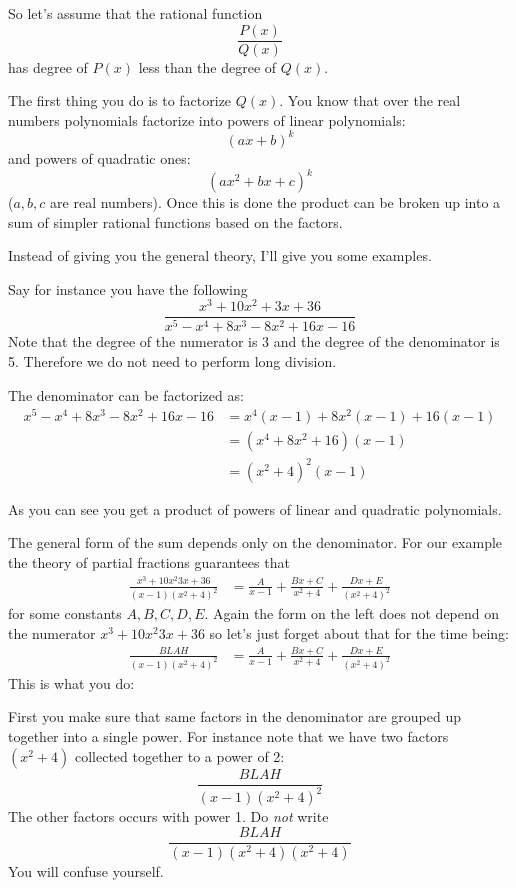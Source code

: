 So let's assume that the rational function
\[
\frac{P(x)}{Q(x)}
\]
has degree of $P(x)$ less than the degree of $Q(x)$.

The first thing you do is to factorize $Q(x)$.
You know that over the real numbers polynomials factorize into powers
of linear polynomials:
\[
(ax + b)^k
\]
and powers of quadratic ones:
\[
(ax^2 + bx + c)^k
\]
($a, b, c$ are real numbers).
Once this is done the product can be broken up into
a sum of simpler rational functions based on the
factors.

Instead of giving you the general theory,
I'll give you some examples.

Say for instance you have the following
\[
\frac{x^3 + 10x^2 + 3x + 36}{x^5 - x^4 + 8x^3 - 8x^2 + 16x - 16}
\]
Note that the degree of the numerator is 3 and the degree of the
denominator is 5.
Therefore we do not need to perform long division.

The denominator can be factorized as:
\begin{align*}
x^5 - x^4 + 8x^3 - 8x^2 + 16x - 16
&= x^4(x - 1) + 8x^2(x - 1) + 16(x - 1) \\
&= (x^4 + 8x^2 + 16)(x - 1) \\
&= (x^2 + 4)^2(x - 1) 
\end{align*}

As you can see you get a product of powers of linear and quadratic 
polynomials.

The general form of the sum depends only on the denominator.
For our example the theory of partial fractions
guarantees that
\begin{align*}
\frac{x^3 + 10x^2  3x + 36}{(x - 1)(x^2 + 4)^2}
&=
\frac{A}{x - 1} +
\frac{Bx + C}{x^2 + 4} + \frac{Dx + E}{(x^2 + 4)^2}
\end{align*}
for some constants $A, B, C, D, E$.
Again the form on the left does not depend on the
numerator $x^3 + 10x^2  3x + 36$ so let's 
just forget about that for the time being:
\begin{align*}
\frac{BLAH}{(x - 1)(x^2 + 4)^2}
&=
\frac{A}{x - 1} +
\frac{Bx + C}{x^2 + 4} + \frac{Dx + E}{(x^2 + 4)^2}
\end{align*}
This is what you do:

First you make sure that same factors in the denominator
are grouped up together into a single power.
For instance note that we have two factors $(x^2+4)$
collected together to a power of 2:
\[
\frac{BLAH}{(x - 1)(x^2 + 4)^2}
\]
The other factors occurs with power 1.
Do \textit{not} write
\[
\frac{BLAH}{(x - 1)(x^2 + 4)(x^2 + 4)}
\]
You will confuse yourself.

